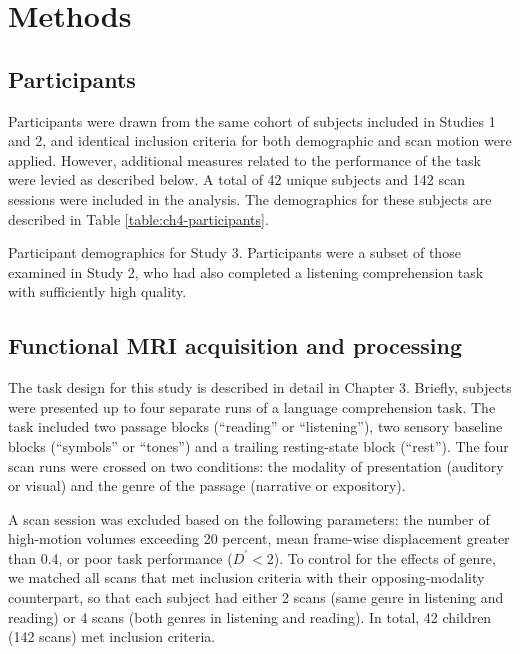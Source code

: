 \section{Methods}

\subsection{Participants}

Participants were drawn from the same cohort of subjects included in Studies 1 and 2, and identical inclusion criteria for both demographic and scan motion were applied. However, additional measures related to the performance of the task were levied as described below. A total of 42 unique subjects and 142 scan sessions were included in the analysis. The demographics for these subjects are described in Table \ref{table:ch4-participants}.

\begin{table}[t]
	\renewcommand{\tabcolsep}{0.09cm}
	\centering
	
	\caption[Participant demographics for Study 3]{Participant demographics for Study 3. Participants were a subset of those examined in Study 2, who had also completed a listening comprehension task with sufficiently high quality.}
	\label{table:ch4-participants}
\end{table}

\subsection{Functional MRI acquisition and processing}

The task design for this study is described in detail in Chapter 3. Briefly, subjects were presented up to four separate runs of a language comprehension task. The task included two passage blocks (``reading'' or ``listening''), two sensory baseline blocks (``symbols'' or ``tones'') and a trailing resting-state block (``rest''). The four scan runs were crossed on two conditions: the modality of presentation (auditory or visual) and the genre of the passage (narrative or expository). 

A scan session was excluded based on the following parameters: the number of high-motion volumes exceeding 20 percent, mean frame-wise displacement greater than 0.4, or poor task performance ($D^\prime < 2$). To control for the effects of genre, we matched all scans that met inclusion criteria with their opposing-modality counterpart, so that each subject had either 2 scans (same genre in listening and reading) or 4 scans (both genres in listening and reading). In total, 42 children (142 scans) met inclusion criteria.

